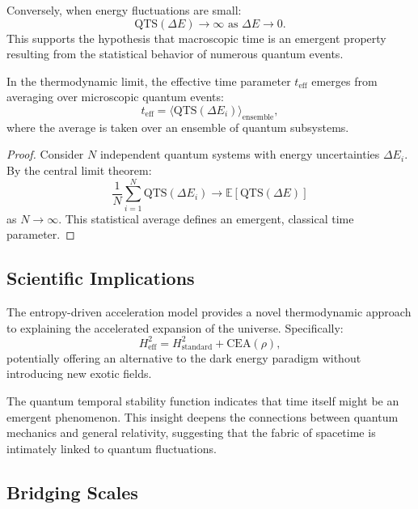 \begin{proposition}
Conversely, when energy fluctuations are small:
\[
\text{QTS}(\Delta E) \to \infty \text{ as } \Delta E \to 0.
\]
This supports the hypothesis that macroscopic time is an emergent property resulting from the statistical behavior of numerous quantum events.
\end{proposition}

\begin{theorem}
In the thermodynamic limit, the effective time parameter $t_{\text{eff}}$ emerges from averaging over microscopic quantum events:
\[
t_{\text{eff}} = \langle \text{QTS}(\Delta E_i) \rangle_{\text{ensemble}},
\]
where the average is taken over an ensemble of quantum subsystems.
\end{theorem}

\begin{proof}
Consider $N$ independent quantum systems with energy uncertainties $\Delta E_i$. By the central limit theorem:
\[
\frac{1}{N}\sum_{i=1}^N \text{QTS}(\Delta E_i) \to \mathbb{E}[\text{QTS}(\Delta E)]
\]
as $N \to \infty$. This statistical average defines an emergent, classical time parameter.
\end{proof}

\subsection{Scientific Implications}

\begin{theorem}
The entropy-driven acceleration model provides a novel thermodynamic approach to explaining the accelerated expansion of the universe. Specifically:
\[
H^2_{\text{eff}} = H^2_{\text{standard}} + \text{CEA}(\rho),
\]
potentially offering an alternative to the dark energy paradigm without introducing new exotic fields.
\end{theorem}

\begin{proposition}
The quantum temporal stability function indicates that time itself might be an emergent phenomenon. This insight deepens the connections between quantum mechanics and general relativity, suggesting that the fabric of spacetime is intimately linked to quantum fluctuations.
\end{proposition}

\subsection{Bridging Scales}

